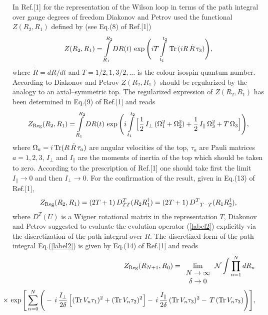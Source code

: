 \documentclass[a4paper,11pt]{article}
\begin{document}
\hspace{0.2in} In Ref.[1] for the representation of the Wilson loop in
terms of the path integral over gauge degrees of freedom Diakonov and
Petrov used the functional $Z(R_2,R_1)$ defined by (see Eq.(8) of
Ref.[1])
%
\begin{eqnarray}\label{label1}
Z(R_2,R_1) =
\int\limits^{R_2}_{R_1}DR(t)\,\exp\Bigg(iT\int\limits^{t_2}_{t_1}\,{\rm
Tr}\,(iR\,\dot{R}\,\tau_3)\Bigg),
\end{eqnarray}
%
where $\dot{R} = dR/dt$ and $T = 1/2,1,3/2,\ldots$ is the colour
isospin quantum number. According to Diakonov and Petrov $Z(R_2,R_1)$
should be regularized by the analogy to an axial--symmetric top. The
regularized expression of $Z(R_2,R_1)$ has been determined in Eq.(9)
of Ref.[1] and reads
%
\begin{eqnarray}\label{label2}
Z_{\rm Reg}(R_2,R_1) =
\int\limits^{R_2}_{R_1}DR(t)\,\exp\Bigg(i\int\limits^{t_2}_{t_1}
\Big[\frac{1}{2}\,I_{\perp}\,(\Omega^2_1 + \Omega^2_2) +
\frac{1}{2}\,I_{\parallel}\,\Omega^2_3 + T\,\Omega_3\Big]\Bigg),
\end{eqnarray}
%
where $\Omega_a = i\,{\rm Tr}(R\,\dot{R}\,\tau_a)$ are angular
velocities of the top, $\tau_a$ are Pauli matrices $a=1,2,3$,
$I_{\perp}$ and $I_{\parallel}$ are the moments of inertia of the top
which should be taken to zero. According to the prescription of
Ref.[1] one should take first the limit $I_{\parallel} \to 0$ and then
$I_{\perp} \to 0$. For the confirmation of the result, given in
Eq.(13) of Ref.[1],
%
\begin{eqnarray}\label{label3}
Z_{\rm Reg}(R_2,R_1) = (2T + 1)\,D^T_{TT}(R_2R^{\dagger}_1) = (2T +
1)\,D^T_{-T-T}(R_1R^{\dagger}_2),
\end{eqnarray}
%
where $D^T(U)$ is a Wigner rotational matrix in the representation
$T$, Diakonov and Petrov suggested to evaluate the evolution operator
(\ref{label2}) explicitly via the discretization of the path integral
over $R$.  The discretized form of the path integral Eq.(\ref{label2})
is given by Eq.(14) of Ref.[1] and reads
%
\begin{eqnarray}\label{label4}
\hspace{-0.5in}&&Z_{\rm Reg}(R_{N+1},R_0) = \lim_{\begin{array}{c} N\to
\infty\\ \delta \to 0\end{array}}{\cal N}\int\prod^{N}_{n=1}dR_n\nonumber\\ 
\hspace{-0.5in}&&\times\,\exp\Bigg[\sum^{N}_{n=0}
\Bigg(-\,i\,\frac{I_{\perp}}{2\delta}\,\Big[({\rm Tr}\,V_n\tau_1)^2 +
({\rm Tr}\,V_n\tau_2)^2\Big] - \,i\,\frac{I_{\parallel}}{2\delta}\,({\rm
Tr}\,V_n\tau_3)^2 -\,T\,({\rm Tr}\,V_n\tau_3)\Bigg)\Bigg],
\end{eqnarray}
\end{document}
